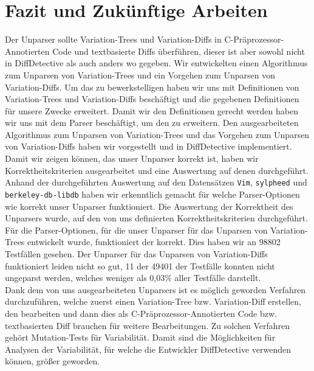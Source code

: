 \chapter{Fazit und Zukünftige Arbeiten}

Der Unparser sollte Variation-Trees und Variation-Diffs in C-Präprozessor-Annotierten Code und textbasierte Diffs überführen, dieser ist aber sowohl nicht in DiffDetective als auch anders wo gegeben. Wir entwickelten einen Algorithmus zum Unparsen von Variation-Trees und ein Vorgehen zum Unparsen von Variation-Diffs. Um das zu bewerkstelligen haben wir uns mit Definitionen von Variation-Trees und Variation-Diffs beschäftigt und die gegebenen Definitionen für unsere Zwecke erweitert. Damit wir den Definitionen gerecht werden haben wir uns mit dem Parser beschäftigt, um den zu erweitern. Den ausgearbeiteten Algorithmus zum Unparsen von Variation-Trees und das Vorgehen zum Unparsen von Variation-Diffs haben wir vorgestellt und in DiffDetective implementiert. Damit wir zeigen können, das unser Unparser korrekt ist, haben wir Korrektheitskriterien ausgearbeitet und eine Auswertung auf denen durchgeführt.\\

Anhand der durchgeführten Auswertung auf den Datensätzen \texttt{Vim}, \texttt{sylpheed} und \\ \texttt{berkeley-db-libdb} haben wir erkenntlich gemacht für welche Parser-Optionen wie korrekt unser Unparser funktioniert. Die Auswertung der Korrektheit des Unparsers wurde, auf den von uns definierten Korrektheitskriterien durchgeführt. Für die Parser-Optionen, für die unser Unparser für das Unparsen von Variation-Trees entwickelt wurde, funktioniert der korrekt. Dies haben wir an 98802 Testfällen gesehen. Der Unparser für das Unparsen von Variation-Diffs funktioniert leiden nicht so gut, 11 der 49401 der Testfälle konnten nicht ungeparst werden, welches weniger als 0,03$\%$ aller Testfälle darstellt.\\

Dank dem von uns ausgearbeiteten Unparsers ist es möglich geworden Verfahren durchzuführen, welche zuerst einen Variation-Tree bzw. Variation-Diff erstellen, den bearbeiten und dann dies als C-Präprozessor-Annotierten Code bzw. textbasierten Diff brauchen für weitere Bearbeitungen. Zu solchen Verfahren gehört Mutation-Tests für Variabilität. Damit sind die Möglichkeiten für Analysen der Variabilität, für welche die Entwickler DiffDetective verwenden können, größer geworden.\\


